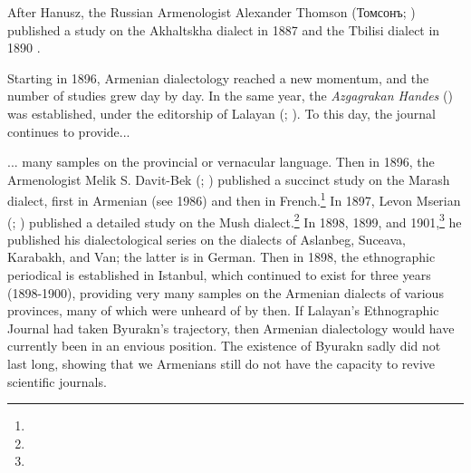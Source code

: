After Hanusz, the Russian Armenologist Alexander Thomson (Томсонъ; ) published a study on the Akhaltskha dialect in 1887 \citep{Thomson-1887-Karin} and the Tbilisi dialect in 1890 \citep{Thomson-1890-Tiflis}. 

Starting in 1896, Armenian dialectology reached a new momentum, and the number of studies grew day by day. In the same year, the \textit{Azgagrakan Handes} () was established, under the editorship of Lalayan (; ). To this day, the journal continues to provide... 



\begin{adjarianpage}\label{page:3}\end{adjarianpage}%

... many samples on the provincial or vernacular language. Then in 1896, the Armenologist Melik S. Davit-Bek (; ) published a succinct study on the Marash dialect, first in Armenian (see  1986) and then in French.\footnote{ } In 1897, Levon Mserian (; ) published a detailed study on the Mush dialect.\footnote{} In 1898, 1899, and 1901,\footnote{} he published his dialectological series on the dialects of Aslanbeg, Suceava, Karabakh, and Van; the latter is in German. Then in 1898, the  ethnographic periodical is established in Istanbul, which continued to exist for three years (1898-1900), providing very many samples on the Armenian dialects of various provinces, many of which were unheard of by then. If Lalayan's Ethnographic Journal had taken Byurakn's trajectory, then Armenian dialectology would have currently been in an envious position. The existence of Byurakn sadly did not last long, showing that we Armenians still do not have the capacity to revive scientific journals. 

